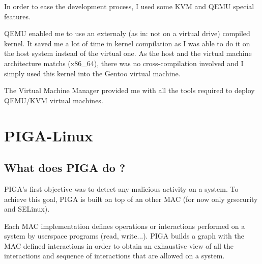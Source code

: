 \documentclass[pdftex,a4paper,titlepage,11pt]{article}
\begin{document}
In order to ease the development process, I used some KVM and QEMU special features.

\bigskip

QEMU enabled me to use an externaly (as in: not on a virtual drive) compiled kernel. It saved me a lot of time in kernel compilation as I was able to do it on the host system instead of the virtual one. As the host and the virtual machine architecture matchs (x86\_64), there was no cross-compilation involved and I simply used this kernel into the Gentoo virtual machine.

\bigskip

The Virtual Machine Manager provided me with all the tools required to deploy QEMU/KVM virtual machines.



\newpage

\section{PIGA-Linux}

\subsection{What does PIGA do ?}

PIGA's first objective was to detect any malicious activity on a system. To achieve this goal, PIGA is built on top of an other MAC (for now only grsecurity and SELinux). 

\bigskip

Each MAC implementation defines operations or interactions performed on a system by userspace programs (read, write...). PIGA  builds a graph with the MAC defined interactions in order to obtain an exhaustive view of all the interactions and sequence of interactions that are allowed on a system.
\end{document}
